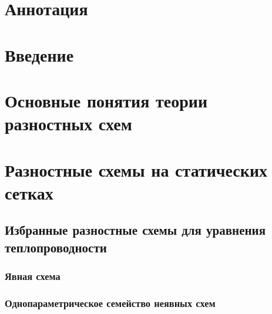\documentclass[a4paper, 14pt]{article}
\begin{document}
    
    

    \section*{Аннотация}
    
    \newpage

    \tableofcontents
    \newpage

    \section*{Введение}
    

    \section{Основные понятия теории разностных схем}\label{sec:MainDiffSchemes}
    

    \section{Разностные схемы на статических сетках}\label{sec:StaticGrid}
        

        \subsection{Избранные разностные схемы для уравнения теплопроводности}
            \subsubsection{Явная схема}
            
            \subsubsection{Однопараметрическое семейство неявных схем}
            
\end{document}
